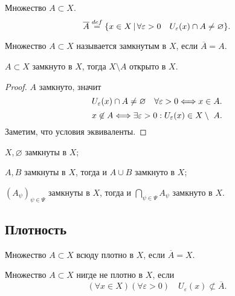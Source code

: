 \begin{definition}
    Множество $A \subset X$. \[\overline A \overset{def}{=} \{x\in X\,|\, \forall \varepsilon>0 \quad U_\varepsilon(x)\cap A \neq \varnothing\}.\]
\end{definition}
\begin{definition}
    Множество $A\subset X$ называется замкнутым в $X$, если $\overline A = A.$
\end{definition}

\begin{theorem}
    $A \subset X$  замкнуто в $X$, тогда $X\setminus A$ открыто в $X.$
\end{theorem}
\begin{proof}
    $A$ замкнуто, значит \begin{equation}\label{eq:1.7}
        U_\varepsilon(x) \cap A \neq \varnothing \quad \forall \varepsilon > 0 \Longleftrightarrow x \in A.
    \end{equation}
    \begin{equation}\label{eq:1.8}
        x\not\in A \Longleftrightarrow \exists \varepsilon > 0: U_\varepsilon(x) \in X \setminus \ A.
    \end{equation}
    Заметим, что условия  эквиваленты. 
\end{proof}

\begin{corollary}
    \begin{conditions}
        \item $X, \varnothing$ замкнуты в $X$;
        \item $A, B$ замкнуты в $X$, тогда и $A\cup B$ замкнуто в $X$;
        \item $(A_\psi)_{\psi \in \Psi}$ замкнуты в $X$, тогда и $\bigcap_{\psi\in\Psi}A_\psi$ замкнуто в $X$.
    \end{conditions}
\end{corollary}

\subsection{Плотность}
\begin{definition}
    Множество $A \subset X$ всюду плотно в $X$, если $\overline A = X.$
\end{definition}
\begin{definition}
    Множество $A\subset X$ нигде не плотно в $X$, если \[(\forall x \in X)(\forall \varepsilon > 0) \quad U_\varepsilon(x)\not\subset \overline A.\]
\end{definition}

